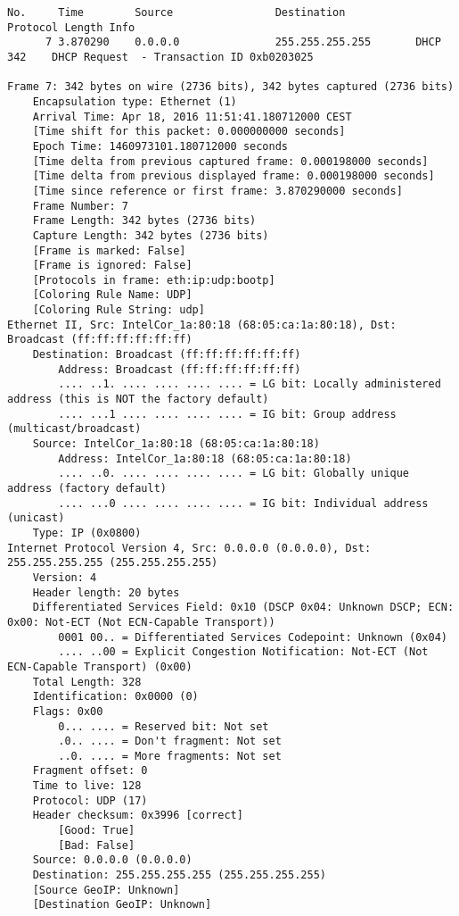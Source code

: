 \begin{lstlisting}
No.     Time        Source                Destination           Protocol Length Info
      7 3.870290    0.0.0.0               255.255.255.255       DHCP     342    DHCP Request  - Transaction ID 0xb0203025

Frame 7: 342 bytes on wire (2736 bits), 342 bytes captured (2736 bits)
    Encapsulation type: Ethernet (1)
    Arrival Time: Apr 18, 2016 11:51:41.180712000 CEST
    [Time shift for this packet: 0.000000000 seconds]
    Epoch Time: 1460973101.180712000 seconds
    [Time delta from previous captured frame: 0.000198000 seconds]
    [Time delta from previous displayed frame: 0.000198000 seconds]
    [Time since reference or first frame: 3.870290000 seconds]
    Frame Number: 7
    Frame Length: 342 bytes (2736 bits)
    Capture Length: 342 bytes (2736 bits)
    [Frame is marked: False]
    [Frame is ignored: False]
    [Protocols in frame: eth:ip:udp:bootp]
    [Coloring Rule Name: UDP]
    [Coloring Rule String: udp]
Ethernet II, Src: IntelCor_1a:80:18 (68:05:ca:1a:80:18), Dst: Broadcast (ff:ff:ff:ff:ff:ff)
    Destination: Broadcast (ff:ff:ff:ff:ff:ff)
        Address: Broadcast (ff:ff:ff:ff:ff:ff)
        .... ..1. .... .... .... .... = LG bit: Locally administered address (this is NOT the factory default)
        .... ...1 .... .... .... .... = IG bit: Group address (multicast/broadcast)
    Source: IntelCor_1a:80:18 (68:05:ca:1a:80:18)
        Address: IntelCor_1a:80:18 (68:05:ca:1a:80:18)
        .... ..0. .... .... .... .... = LG bit: Globally unique address (factory default)
        .... ...0 .... .... .... .... = IG bit: Individual address (unicast)
    Type: IP (0x0800)
Internet Protocol Version 4, Src: 0.0.0.0 (0.0.0.0), Dst: 255.255.255.255 (255.255.255.255)
    Version: 4
    Header length: 20 bytes
    Differentiated Services Field: 0x10 (DSCP 0x04: Unknown DSCP; ECN: 0x00: Not-ECT (Not ECN-Capable Transport))
        0001 00.. = Differentiated Services Codepoint: Unknown (0x04)
        .... ..00 = Explicit Congestion Notification: Not-ECT (Not ECN-Capable Transport) (0x00)
    Total Length: 328
    Identification: 0x0000 (0)
    Flags: 0x00
        0... .... = Reserved bit: Not set
        .0.. .... = Don't fragment: Not set
        ..0. .... = More fragments: Not set
    Fragment offset: 0
    Time to live: 128
    Protocol: UDP (17)
    Header checksum: 0x3996 [correct]
        [Good: True]
        [Bad: False]
    Source: 0.0.0.0 (0.0.0.0)
    Destination: 255.255.255.255 (255.255.255.255)
    [Source GeoIP: Unknown]
    [Destination GeoIP: Unknown]

\end{lstlisting}
